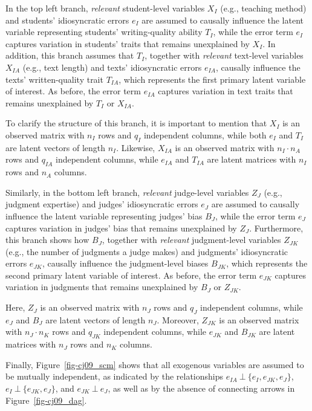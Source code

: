\documentclass[
  authoryear,
  review,
  1p]{elsarticle}
\begin{document}
In the top left branch, \emph{relevant} student-level variables
\(X_{I}\) (e.g., teaching method) and students' idiosyncratic errors
\(e_{I}\) are assumed to causally influence the latent variable
representing students' writing-quality ability \(T_{I}\), while the
error term \(e_{I}\) captures variation in students' traits that remains
unexplained by \(X_{I}\). In addition, this branch assumes that
\(T_{I}\), together with \emph{relevant} text-level variables \(X_{IA}\)
(e.g., text length) and texts' idiosyncratic errors \(e_{IA}\), causally
influence the texts' written-quality trait \(T_{IA}\), which represents
the first primary latent variable of interest. As before, the error term
\(e_{IA}\) captures variation in text traits that remains unexplained by
\(T_{I}\) or \(X_{IA}\).

To clarify the structure of this branch, it is important to mention that
\(X_{I}\) is an observed matrix with \(n_{I}\) rows and \(q_{I}\)
independent columns, while both \(e_{I}\) and \(T_{I}\) are latent
vectors of length \(n_{I}\). Likewise, \(X_{IA}\) is an observed matrix
with \(n_{I} \cdot n_{A}\) rows and \(q_{IA}\) independent columns,
while \(e_{IA}\) and \(T_{IA}\) are latent matrices with \(n_{I}\) rows
and \(n_{A}\) columns.

Similarly, in the bottom left branch, \emph{relevant} judge-level
variables \(Z_{J}\) (e.g., judgment expertise) and judges' idiosyncratic
errors \(e_{J}\) are assumed to causally influence the latent variable
representing judges' bias \(B_{J}\), while the error term \(e_{J}\)
captures variation in judges' bias that remains unexplained by
\(Z_{J}\). Furthermore, this branch shows how \(B_{J}\), together with
\emph{relevant} judgment-level variables \(Z_{JK}\) (e.g., the number of
judgments a judge makes) and judgments' idiosyncratic errors \(e_{JK}\),
causally influence the judgment-level biases \(B_{JK}\), which
represents the second primary latent variable of interest. As before,
the error term \(e_{JK}\) captures variation in judgments that remains
unexplained by \(B_{J}\) or \(Z_{JK}\).

Here, \(Z_{J}\) is an observed matrix with \(n_{J}\) rows and \(q_{J}\)
independent columns, while \(e_{J}\) and \(B_{J}\) are latent vectors of
length \(n_{J}\). Moreover, \(Z_{JK}\) is an observed matrix with
\(n_{J} \cdot n_{K}\) rows and \(q_{JK}\) independent columns, while
\(e_{JK}\) and \(B_{JK}\) are latent matrices with \(n_{J}\) rows and
\(n_{K}\) columns.

Finally, Figure~\ref{fig-cj09_scm} shows that all exogenous variables
are assumed to be mutually independent, as indicated by the
relationships \(e_{IA} \:\bot\:\{ e_{I}, e_{JK}, e_{J} \}\),
\(e_{I} \:\bot\:\{ e_{JK}, e_{J} \}\), and \(e_{JK} \:\bot\:e_{J}\), as
well as by the absence of connecting arrows in
Figure~\ref{fig-cj09_dag}.
\end{document}
